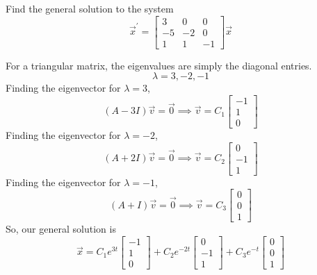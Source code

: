 \begin{example}
	Find the general solution to the system
	\begin{equation*}
		\vec{x}^\prime = \begin{bmatrix}
			3 & 0 & 0 \\
			-5 & -2 & 0 \\
			1 & 1 & -1
		\end{bmatrix} \vec{x}
	\end{equation*}
\end{example}
\noindent
For a triangular matrix, the eigenvalues are simply the diagonal entries.
\begin{equation*}
	\lambda = 3, -2, -1
\end{equation*}
Finding the eigenvector for $\lambda = 3$,
\begin{equation*}
	(A - 3I)\vec{v} = \vec{0} \implies \vec{v} = C_1\begin{bmatrix}
		-1 \\
		1 \\
		0
	\end{bmatrix}
\end{equation*}
Finding the eigenvector for $\lambda = -2$,
\begin{equation*}
	(A + 2I)\vec{v} = \vec{0} \implies \vec{v} = C_2\begin{bmatrix}
		0 \\
		-1 \\
		1
	\end{bmatrix}
\end{equation*}
Finding the eigenvector for $\lambda = -1$,
\begin{equation*}
	(A + I)\vec{v} = \vec{0} \implies \vec{v} = C_3\begin{bmatrix}
		0 \\
		0 \\
		1
	\end{bmatrix}
\end{equation*}
So, our general solution is
\begin{equation*}
	\vec{x} = C_1e^{3t}\begin{bmatrix}
		-1 \\
		1 \\
		0
	\end{bmatrix} + C_2e^{-2t}\begin{bmatrix}
		0 \\
		-1 \\
		1
	\end{bmatrix} + C_3e^{-t}\begin{bmatrix}
		0 \\
		0 \\
		1
	\end{bmatrix}
\end{equation*}